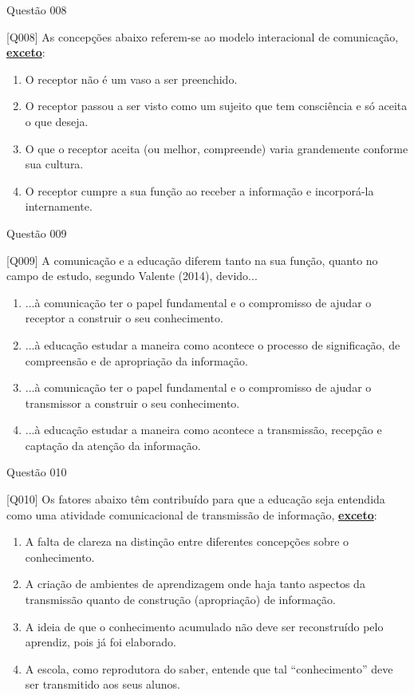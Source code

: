 \documentclass[xcolor=dvipsnames,table]{beamer}
\begin{document}
    \begin{frame}{Questão 008}
		\begin{block}{[Q008]}
		As concepções abaixo referem-se ao modelo interacional de comunicação, \underline{\bf exceto}:
		\end{block}
		\begin{enumerate}[label=(\Alph*)]
			\item  O receptor não é um vaso a ser preenchido.
			\item O receptor passou a ser visto como um sujeito que tem consciência e só aceita o que deseja.
			\item O que o receptor aceita (ou melhor, compreende) varia grandemente conforme sua cultura.
			\item O receptor cumpre a sua função ao receber a informação e incorporá-la internamente.
		\end{enumerate}
	\end{frame}

    \begin{frame}{Questão 009}
		\begin{block}{[Q009]}
		 A comunicação e a educação diferem tanto na sua função, quanto no campo de estudo, segundo Valente (2014), devido...
		\end{block}
		\begin{enumerate}[label=(\Alph*)]
			\item ...à comunicação ter o papel fundamental e o compromisso de ajudar o receptor a construir o seu conhecimento.
			\item ...à educação estudar a maneira como acontece o processo de significação, de compreensão e de apropriação da informação.
			\item ...à comunicação ter o papel fundamental e o compromisso de ajudar o transmissor a construir o seu conhecimento.
			\item ...à educação estudar a maneira como acontece a transmissão, recepção e captação da atenção da informação.
		\end{enumerate}
	\end{frame}

\begin{frame}{Questão 010}
		\begin{block}{[Q010]}
		 Os fatores abaixo têm contribuído para que a educação seja entendida como uma atividade comunicacional de transmissão de informação, \underline{\bf exceto}:
		\end{block}
		\begin{enumerate}[label=(\Alph*)]
			\item A falta de clareza na distinção entre diferentes concepções sobre o conhecimento.
			\item A criação de ambientes de aprendizagem onde haja tanto aspectos da transmissão quanto de construção (apropriação) de informação.
			\item A ideia de que o conhecimento acumulado não deve ser reconstruído pelo aprendiz, pois já foi elaborado.
			\item A escola, como reprodutora do saber, entende que tal “conhecimento” deve ser transmitido aos seus alunos. 
		\end{enumerate}
	\end{frame}
\end{document}
